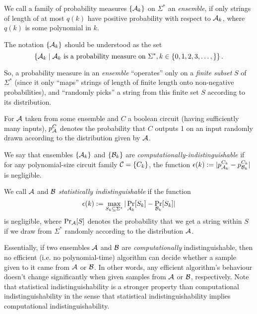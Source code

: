 \begin{definition}[Ensemble]
  We call a family of probability measures $\{{\cal A}_k\}$ on $\Sigma^*$ an \emph{ensemble}, if only strings of length of at most $q(k)$ have positive probability with respect to ${\cal A}_k$, where $q(k)$ is some polynomial in $k$.
\end{definition}

The notation $\left\{ {\cal A}_k \right\}$ should be understood as the set
\begin{equation*}
\left\{ {\cal A}_k \mid {\cal A}_k \text{ is a probability measure on } \Sigma^*, k\in\left\{ 0,1,2,3,\dots, \right\} \right\}.
\end{equation*}

So, a probability measure in an \emph{ensemble} ``operates'' only on a \emph{finite subset} $S$ of $\Sigma^*$ (since it only ``maps'' strings of length of finite length onto non-negative probabilities), and ``randomly picks'' a string from this finite set $S$ according to its distribution.

\begin{definition}[Indistinguishability]
  For ${\cal A}$ taken from some ensemble and $C$ a boolean circuit (having sufficiently many inputs), $p_{\cal A}^C$ denotes the probability that $C$ outputs 1 on an input randomly drawn according to the distribution given by ${\cal A}$.

  We say that ensembles $\left\{{\cal A}_k\right\}$ and $\left\{{\cal B}_k\right\}$ are \emph{computationally-indistinguishable} if for any polynomial-size circuit family ${\cal C}=\{C_k\}$, the function $\epsilon(k):=|p_{{\cal A}_k}^{C_k}-p_{{\cal B}_k}^{C_k}|$ is negligible.
  
  We call ${\cal A}$ and ${\cal B}$ \emph{statistically indistinguishable} if the function 
  \begin{equation*}
\epsilon(k):=\max_{S_k\subseteq \Sigma^*}|\Pr_{{\cal A}_k}[S_k]-\Pr_{{\cal B}_k}[S_k]|
\end{equation*}
is negligible, where $\Pr_{{\cal A}}[S]$ denotes the probability that we get a string within $S$ if we draw from $\Sigma^*$ randomly according to the distribution ${\cal A}$.
\end{definition}

Essentially, if two ensembles ${\cal A}$ and ${\cal B}$ are \emph{computationally} indistinguishable, then no efficient (i.e. no polynomial-time) algorithm can decide whether a sample given to it came from ${\cal A}$ or ${\cal B}$. In other words, any efficient algorithm's behaviour doesn't change significantly when given samples from ${\cal A}$ or ${\cal B}$, respectively. Note that statistical indistinguishability is a stronger property than computational indistinguishability in the sense that statistical indistinguishability implies computational indistinguishability.

